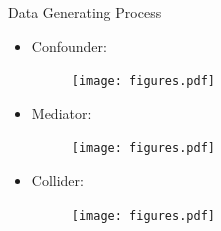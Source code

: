 \documentclass[aspectratio=169]{beamer}
\begin{document}
\begin{frame}{Data Generating Process}
	\vspace{1em}
	\begin{itemize}
		\item Confounder:  \begin{figure}[H] \texttt{[image: figures.pdf]}\end{figure}
		\item Mediator: \begin{figure}[H] \texttt{[image: figures.pdf]} \end{figure}
		\item Collider: \begin{figure}[H] \texttt{[image: figures.pdf]} \end{figure}
	\end{itemize}
\end{frame}
\end{document}
